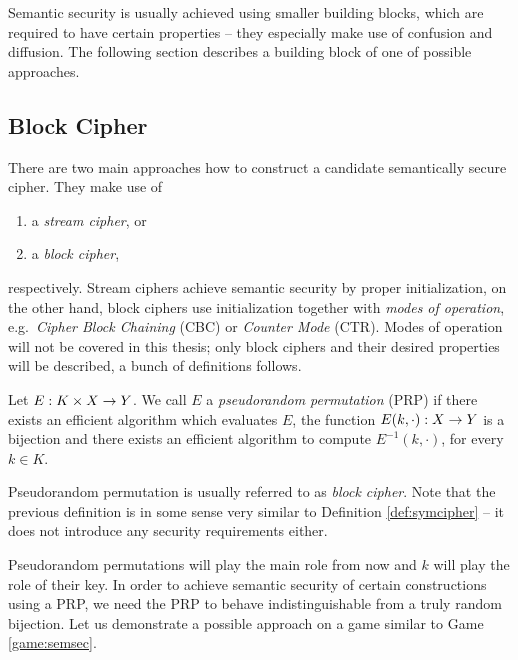 	Semantic security is usually achieved using smaller building blocks, which are required to have certain properties -- they especially make use of confusion and diffusion. The following section describes a building block of one of possible approaches.



\subsection{Block Cipher}

There are two main approaches how to construct a candidate semantically secure cipher. They make use of
\begin{enumerate}
	\item a {\em stream cipher}, or
	\item a {\em block cipher},
\end{enumerate}
respectively. Stream ciphers achieve semantic security by proper initialization, on the other hand, block ciphers use initialization together with {\em modes of operation}, e.g.\ {\em Cipher Block Chaining} (CBC) or {\em Counter Mode} (CTR). Modes of operation will not be covered in this thesis; only block ciphers and their desired properties will be described, a bunch of definitions follows.

\begin{defn}
\label{def:prp}
	Let $E: K\times X\rightarrow Y$. We call $E$ a {\em pseudorandom permutation} (PRP) if there exists an efficient algorithm which evaluates $E$, the function $E(k,\cdot): X\rightarrow Y$ is a bijection and there exists an efficient algorithm to compute $E^{-1}(k,\cdot)$, for every $k\in K$.
\end{defn}

\begin{note}
	Pseudorandom permutation is usually referred to as {\em block cipher}. Note that the previous definition is in some sense very similar to Definition \ref{def:symcipher} -- it does not introduce any security requirements either.
\end{note}

Pseudorandom permutations will play the main role from now and $k$ will play the role of their key. In order to achieve semantic security of certain constructions using a PRP, we need the PRP to behave indistinguishable from a truly random bijection. Let us demonstrate a possible approach on a game similar to Game \ref{game:semsec}.

